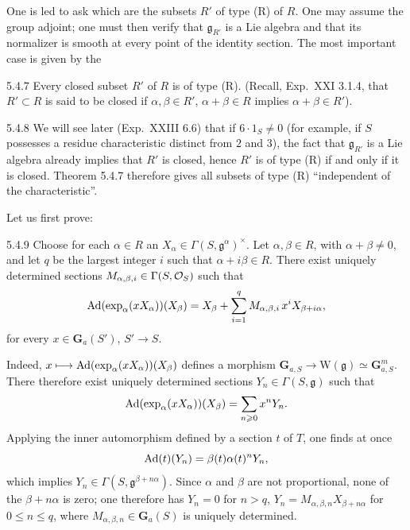 One is led to ask which are the subsets $R'$ of type (R) of $R$. One may assume the group adjoint; one must then verify that $\mathfrak g_{R'}$ is a Lie algebra and that its normalizer is smooth at every point of the identity section. The most important case is given by the
\begin{theorem}{5.4.7}\label{XXII.5.4.7}
Every closed subset $R'$ of $R$ is of type (R). (Recall, \cf Exp.~XXI 3.1.4, that $R'\subset R$ is said to be closed if $\alpha,\beta\in R'$, $\alpha+\beta\in R$ implies $\alpha+\beta\in R'$).
\end{theorem}
\begin{remark}{5.4.8}\label{XXII.5.4.8}
We will see later (Exp.~XXIII 6.6) that if $6\cdot1_S\ne0${\renewcommand{\thefootnote}{(35)}} (for example, if $S$ possesses a residue characteristic distinct from $2$ and $3$), the fact that $\mathfrak g_{R'}$ is a Lie algebra already implies that $R'$ is closed, hence $R'$ is of type (R) if and only if it is closed. Theorem 5.4.7 therefore gives all subsets of type (R) ``independent of the characteristic''.
\end{remark}
Let us first prove:
\begin{lemma}{5.4.9}\label{XXII.5.4.9}
Choose for each $\alpha\in R$ an $X_\alpha\in\Gamma(S,\mathfrak g^\alpha)^\times$. Let $\alpha,\beta\in R$, with $\alpha+\beta\ne0$, and let $q$ be the largest integer $i$ such that $\alpha+i\beta\in R$. There exist uniquely determined sections $M_{\alpha,\beta,i}\in\Gamma(S,\mathcal{O}_S)$ such that
\[
\operatorname{Ad}(\exp_\alpha(xX_\alpha))(X_\beta)=X_\beta+\sum_{i=1}^q M_{\alpha,\beta,i}\,x^i X_{\beta+i\alpha},
\]
for every $x\in\mathbf G_a(S')$, $S'\to S$.
\end{lemma}
Indeed, $x\longmapsto\operatorname{Ad}(\exp_\alpha(xX_\alpha))(X_\beta)$ defines a morphism $\mathbf G_{a,S}\to\mathrm W(\mathfrak g)\simeq\mathbf G_{a,S}^m$. There therefore exist uniquely determined sections $Y_n\in\Gamma(S,\mathfrak g)$ such that
\[
\operatorname{Ad}(\exp_\alpha(xX_\alpha))(X_\beta)=\sum_{n\geqslant0}x^nY_n.
\]
Applying the inner automorphism defined by a section $t$ of $T$, one finds at once
\[
\operatorname{Ad}(t)(Y_n)=\beta(t)\alpha(t)^nY_n,
\]
which implies $Y_n\in\Gamma(S,\mathfrak g^{\beta+n\alpha})$. Since $\alpha$ and $\beta$ are not proportional, none of the $\beta+n\alpha$ is zero; one therefore has $Y_n=0$ for $n>q$, $Y_n=M_{\alpha,\beta,n}X_{\beta+n\alpha}$ for $0\le n\le q$, where $M_{\alpha,\beta,n}\in\mathbf G_a(S)$ is uniquely determined.
